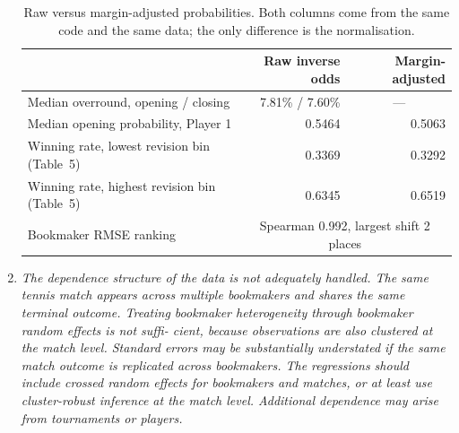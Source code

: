 \documentclass[letterpaper,12pt]{article}
\newcounter{b}
\begin{document}
\begin{enumerate}
{\begin{table}[H]
\centering
\caption{Raw versus margin-adjusted probabilities. Both columns come from the same code and the same data; the only difference is the normalisation.}
\label{tab:r1c1}
\small
\begin{tabular}{lrr}
\toprule
 & Raw inverse odds & Margin-adjusted \\
\midrule
Median overround, opening / closing   & 7.81\% / 7.60\% & \multicolumn{1}{c}{---} \\
Median opening probability, Player 1  & 0.5464 & 0.5063 \\
Winning rate, lowest revision bin (Table~5)  & 0.3369 & 0.3292 \\
Winning rate, highest revision bin (Table~5) & 0.6345 & 0.6519 \\
Bookmaker RMSE ranking & \multicolumn{2}{c}{Spearman 0.992, largest shift 2 places} \\
\bottomrule
\end{tabular}
\end{table}
}

\item \textit{The dependence structure of the data is not adequately handled. The same tennis
match appears across multiple bookmakers and shares the same terminal outcome.
Treating bookmaker heterogeneity through bookmaker random effects is not suffi-
cient, because observations are also clustered at the match level. Standard errors
may be substantially understated if the same match outcome is replicated across
bookmakers. The regressions should include crossed random effects for bookmakers
and matches, or at least use cluster-robust inference at the match level. Additional
dependence may arise from tournaments or players. }


\end{enumerate}
\end{document}
